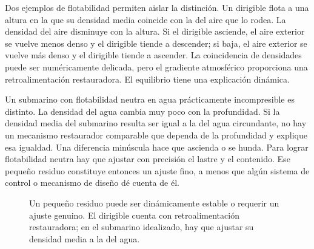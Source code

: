 Dos ejemplos de flotabilidad permiten aislar la distinción. Un dirigible flota a una altura en la que su densidad media coincide con la del aire que lo rodea. La densidad del aire disminuye con la altura. Si el dirigible asciende, el aire exterior se vuelve menos denso y el dirigible tiende a descender; si baja, el aire exterior se vuelve más denso y el dirigible tiende a ascender. La coincidencia de densidades puede ser numéricamente delicada, pero el gradiente atmosférico proporciona una retroalimentación restauradora. El equilibrio tiene una explicación dinámica.

Un submarino con flotabilidad neutra en agua prácticamente incompresible es distinto. La densidad del agua cambia muy poco con la profundidad. Si la densidad media del submarino resulta ser igual a la del agua circundante, no hay un mecanismo restaurador comparable que dependa de la profundidad y explique esa igualdad. Una diferencia minúscula hace que ascienda o se hunda. Para lograr flotabilidad neutra hay que ajustar con precisión el lastre y el contenido. Ese pequeño residuo constituye entonces un ajuste fino, a menos que algún sistema de control o mecanismo de diseño dé cuenta de él.

\begin{figure}[ht]\centering
{}\caption{Un pequeño residuo puede ser dinámicamente estable o requerir un ajuste genuino. El dirigible cuenta con retroalimentación restauradora; en el submarino idealizado, hay que ajustar su densidad media a la del agua.}\label{fig:blimp-submarine}\end{figure}

